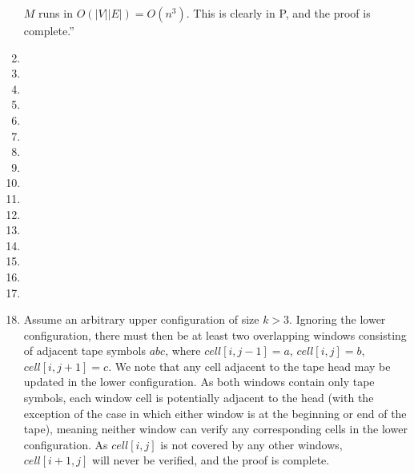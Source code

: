 \documentclass[11pt]{article}
\begin{document}
\begin{enumerate}[7.1]
\begin{enumerate}
    \end{enumerate}
    $M$ runs in $O(|V||E|) = O(n^3)$. This is clearly in P, and the proof is complete.''
    \item
    \item
    \item
    \item
    \item
    \item
    \item
    \item
    \item
    \item
    \item
    \item
    \item
    \item
    \item
    \item
    \item Assume an arbitrary upper configuration of size $k > 3$. Ignoring the lower configuration, there must then be at least two overlapping windows consisting of adjacent tape symbols $abc$, where $cell[i,j-1] = a$, $cell[i,j] = b$, $cell[i,j+1] = c$. We note that any cell adjacent to the tape head may be updated in the lower configuration. As both windows contain only tape symbols, each window cell is potentially adjacent to the head (with the exception of the case in which either window is at the beginning or end of the tape), meaning neither window can verify any corresponding cells in the lower configuration. As $cell[i,j]$ is not covered by any other windows, $cell[i+1,j]$ will never be verified, and the proof is complete.
  \end{enumerate}
\end{document}
